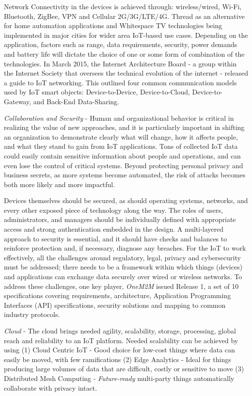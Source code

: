 \documentclass[sigconf]{acmart}
\begin{document}
Network Connectivity in the devices is achieved through: wireless/wired, Wi-Fi, Bluetooth, ZigBee, VPN and Cellular 2G/3G/LTE/4G. Thread as an alternative for home automation applications and Whitespace TV technologies being implemented in major cities for wider area IoT-based use cases. Depending on the application, factors such as range, data requirements, security, power demands and battery life will dictate the choice of one or some form of combination of the technologies. In March 2015, the Internet Architecture Board - a group within the Internet Society that oversees the technical evolution of the internet - released a guide to IoT networking. This outlined four common communication models used by IoT smart objects: Device-to-Device, Device-to-Cloud, Device-to-Gateway, and Back-End Data-Sharing\cite{5_Internet_Society}.

{\em Collaboration and Security} - Human and organizational behavior is critical in realizing the value of new approaches, and it is particularly important in shifting an organization to demonstrate clearly what will change, how it affects people, and what they stand to gain from IoT applications. Tons of collected IoT data could easily contain sensitive information about people and operations, and can even lose the control of critical systems. Beyond protecting personal privacy and business secrets, as more systems become automated, the risk of attacks becomes both more likely and more impactful. 

Devices themselves should be secured, as should operating systems, networks, and every other exposed piece of technology along the way. The roles of users, administrators, and managers should be individually defined with appropriate access and strong authentication embedded in the design. A multi-layered approach to security is essential, and it should have checks and balances to reinforce protection and, if necessary, diagnose any breaches. For the IoT to work effectively, all the challenges around regulatory, legal, privacy and cybersecurity must be addressed; there needs to be a framework within which things (devices) and applications can exchange data securely over wired or wireless networks. To address these challenges, one key player, {\em OneM2M} issued Release 1, a set of 10 specifications covering requirements, architecture, Application Programming Interfaces (API) specifications, security solutions and mapping to common industry protocols\cite{6_OneM2M}.

{\em Cloud} - The cloud brings needed agility, scalability, storage, processing, global reach and reliability to an IoT platform. Needed scalability can be achieved by using (1) Cloud Centric IoT - Good choice for low-cost things where data can easily be moved, with few ramifications (2) Edge Analytics - Ideal for things producing large volumes of data that are difficult, costly or sensitive to move (3) Distributed Mesh Computing - {\em Future-ready} multi-party things automatically collaborate with privacy intact. 
\end{document}
